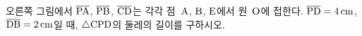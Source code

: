 \noindent\begin{minipage}[t]{0.58\linewidth}\vspace{0pt}\raggedright 오른쪽 그림에서 $\overline{\mathrm{PA}}$, $\overline{\mathrm{PB}}$, $\overline{\mathrm{CD}}$는 각각 점~$\mathrm{A}$, $\mathrm{B}$, $\mathrm{E}$에서 원~$\mathrm{O}$에 접한다. $\overline{\mathrm{PD}}=4\,\mathrm{cm}$, $\overline{\mathrm{DB}}=2\,\mathrm{cm}$일 때, $\triangle\mathrm{CPD}$의 둘레의 길이를 구하시오.\end{minipage}\hfill\begin{minipage}[t]{0.4\linewidth}\vspace{0pt}\centering \resizebox{\ifdim\width>\linewidth\linewidth\else\width\fi}{!}{}\end{minipage}\par
